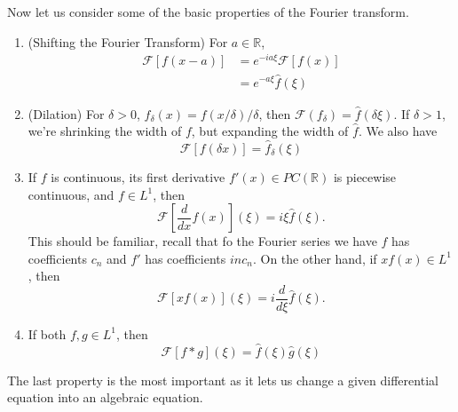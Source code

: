 Now let us consider some of the basic properties of the
Fourier transform.
\begin{enumerate}
\item{(Shifting the Fourier Transform)} For $a\in\mathbb{R}$, 
\begin{align*}
\mathcal{F}\left[f(x-a)\right] &=
e^{-ia\xi}\mathcal{F}[f(x)]\\
&= e^{-a\xi}\widehat{f}(\xi)
\end{align*}
\item{(Dilation)} For $\delta>0$, $f_{\delta}(x) = f(x/\delta)/\delta$,
  then $\mathcal{F}(f_{\delta}) =
  \widehat{f}(\delta\xi)$. If $\delta>1$, we're shrinking
  the width of $f$, but expanding the width of
  $\widehat{f}$. We also have
\begin{equation}
\mathcal{F}\left[f(\delta x)\right] =
\widehat{f}_{\delta}(\xi)
\end{equation}
\item{} If
$f$ is continuous, its first derivative $f'(x)\in
  PC(\mathbb{R})$ is piecewise continuous, and $f\in L^{1}$,
  then
\begin{equation}
\mathcal{F}\left[\frac{d}{dx}f(x)\right](\xi) = i\xi\widehat{f}(\xi).
\end{equation}
This should be familiar, recall that fo the Fourier series
we have $f$ has coefficients $c_n$ and $f'$ has coefficients
$inc_n$. On the other hand, if $xf(x)\in L^{1}$, then
\begin{equation}
\mathcal{F}\left[xf(x)\right](\xi) = i\frac{d}{d\xi}\widehat{f}(\xi).
\end{equation}
\item If both $f,g\in L^{1}$, then
\begin{equation}
\mathcal{F}[f*g](\xi) = \widehat{f}(\xi)\widehat{g}(\xi)
\end{equation}
\end{enumerate}
The last property is the most important as it lets us change
a given differential equation into an algebraic equation.
